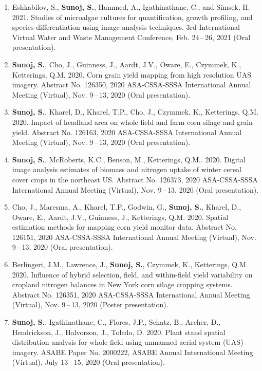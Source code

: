\documentclass[11pt]{article}
\begin{document}
\begin{enumerate}[itemsep=-2pt]
\item Eshkabilov, S., \textbf{Sunoj, S.}, Hammed, A., Igathinathane, C., and Simsek, H. 2021. Studies of microalgae cultures for quantification, growth profiling, and species differentiation using image analysis techniques. 3rd International Virtual Water and Waste Management Conference, Feb. 24\,–\,26, 2021 (Oral presentation).

\item \textbf{Sunoj, S.}, Cho, J., Guinness, J., Aardt, J.V., Oware, E., Czymmek, K., Ketterings, Q.M. 2020. Corn grain yield mapping from high resolution {UAS} imagery. Abstract No. 126350, 2020 ASA-CSSA-SSSA International Annual Meeting (Virtual), Nov. 9\,--\,13, 2020 (Oral presentation).

\item \textbf{Sunoj, S.}, Kharel, D., Kharel, T.{P}., Cho, J., Czymmek, K., Ketterings, Q.M. 2020. Impact of headland area on whole field and farm corn silage and grain yield. Abstract No. 126163, 2020 ASA-CSSA-SSSA International Annual Meeting (Virtual), Nov. 9\,--\,13, 2020 (Oral presentation).

\item \textbf{Sunoj, S.}, McRoberts, K.C., Benson, M., Ketterings, Q.M.. 2020. Digital image analysis estimates of biomass and nitrogen uptake of winter cereal cover crops in the northeast US. Abstract No. 126373, 2020 ASA-CSSA-SSSA International Annual Meeting (Virtual), Nov. 9\,--\,13, 2020 (Oral presentation).

\item Cho, J., Maresma, A., Kharel, T.{P}., Godwin, G., \textbf{Sunoj, S.}, Kharel, D., Oware, E., Aardt, J.V., Guinness, J., Ketterings, Q.M. 2020. Spatial estimation methods for mapping corn yield monitor data. Abstract No. 126151, 2020 ASA-CSSA-SSSA International Annual Meeting (Virtual), Nov. 9\,--\,13, 2020 (Oral presentation).

\item Berlingeri, J.M., Lawrence, J., \textbf{Sunoj, S.}, Czymmek, K., Ketterings, Q.M. 2020. Influence of hybrid selection, field, and within-field yield variability on cropland nitrogen balances in New York corn silage cropping systems. Abstract No. 126351, 2020 ASA-CSSA-SSSA International Annual Meeting (Virtual), Nov. 9\,--\,13, 2020 (Poster presentation).

\item \textbf{Sunoj, S.}, Igathinathane, C., Flores, J.P., Schatz, B., Archer, D., Hendrickson, J., Halvorson, J., Toledo, D. 2020. Plant stand spatial distribution analysis for whole field using unmanned aerial system (UAS) imagery. ASABE Paper No. 2000222, ASABE Annual International Meeting (Virtual), July 13\,--\,15, 2020 (Oral presentation).


\end{enumerate}
\end{document}
